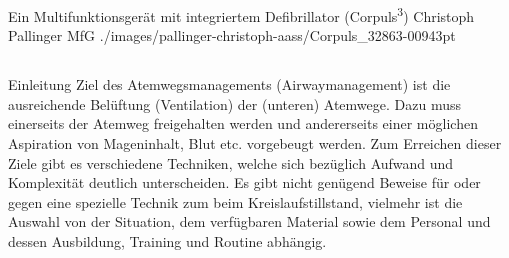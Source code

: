 \Picture
{Ein Multifunktionsgerät mit integriertem Defibrillator (Corpuls\textsuperscript{3}\texttrademark)}%
{}%
{}%
{Christoph Pallinger}%
{MfG}%
{./images/pallinger-christoph-aass/Corpuls_32863-00943pt}%
{}%
{}%



\clearpage%

\subsection{}

\Text
{Einleitung}%
{%
Ziel des Atemwegsmanagements (Airwaymanagement) ist die ausreichende Belüftung (Ventilation) der (unteren) Atemwege.
%
Dazu muss einerseits der Atemweg freigehalten werden
und andererseits einer möglichen Aspiration von Mageninhalt, Blut etc. vorgebeugt werden. 
%
Zum Erreichen dieser Ziele gibt es verschiedene Techniken,
welche sich bezüglich Aufwand und Komplexität deutlich unterscheiden.
%
Es gibt nicht genügend Beweise
für oder gegen eine spezielle Technik zum
 beim Kreislaufstillstand, 
vielmehr ist die Auswahl von 
der Situation, 
dem verfügbaren Material 
sowie dem Personal 
und dessen Ausbildung, 
Training 
und Routine abhängig.
}%


